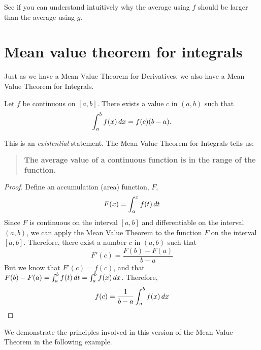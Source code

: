 \documentclass{ximera}
\begin{document}
See if you can understand intuitively why the average using $f$ should
be larger than the average using $g$.  %



\section{Mean value theorem for integrals}

Just as we have a Mean Value Theorem for Derivatives, we also have a
Mean Value Theorem for Integrals.


\begin{theorem}
Let $f$ be continuous on $[a,b]$. There exists a value $c$ in $(a,b)$
such that
\[
\int_a^bf(x)\mathop{}\!d x = f(c)(b-a).
\]
\end{theorem}

This is an \emph{existential} statement. The Mean Value Theorem for
Integrals tells us:
\begin{quote}
\textbf{The average value of a continuous function is in the range of
  the function.}
\end{quote}
\begin{proof}
Define an accumulation (area) function, $F$,
\[
F(x)= \int_a^x f(t)\mathop{}\!d t 
\]
Since $F$ is continuous on the interval $[a,b]$ and differentiable on the interval $(a,b)$, we can apply the Mean Value Theorem to the function $F$ on the interval $[a,b]$.
Therefore, there exist a number $c$ in $(a,b)$ such that
\[
F'(c)=\frac{F(b)-F(a)}{b-a}
\]
But we know that $F'(c)=f(c)$, and that $F(b)-F(a)=\int_a^bf(t)\mathop{}\!d t =\int_a^bf(x)\mathop{}\!d x $.
Therefore,
\[
f(c)=\frac{1}{b-a}\int_a^bf(x)\mathop{}\!d x
\]
\end{proof}
We demonstrate the principles involved in this version of the Mean
Value Theorem in the following example.
\end{document}
